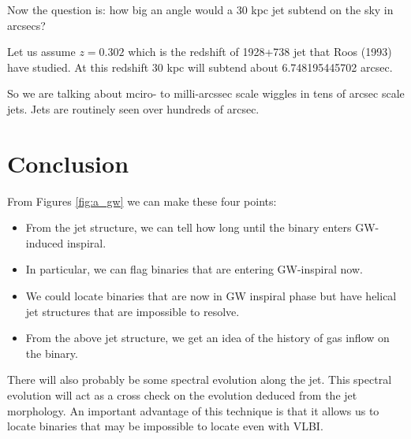\documentclass[iop]{emulateapj}
\begin{document}
Now the question is: how big an angle would a 30 kpc jet subtend on
the sky in arcsecs?

Let us assume $z = 0.302$ which is the redshift of 1928+738 jet that
Roos (1993) have studied.  At this redshift 30 kpc will subtend about
6.748195445702 arcsec.

So we are talking about mciro- to milli-arcssec scale wiggles in tens
of arcsec scale jets.  Jets are routinely seen over hundreds of
arcsec.



\section{Conclusion}

From Figures \ref{fig:a_gw} we can make these four points:

\begin{itemize}
\item From the jet structure, we can tell how long until the binary enters GW-induced inspiral.
\item In particular, we can flag binaries that are entering GW-inspiral now.
\item We could locate binaries that are now in GW inspiral phase but
  have helical jet structures that are impossible to resolve.
\item From the above jet structure, we get an idea of the history of gas inflow on the binary.
\end{itemize}

There will also probably be some spectral evolution along the jet.
This spectral evolution will act as a cross check on the evolution
deduced from the jet morphology.  An important advantage of this
technique is that it allows us to locate binaries that may be
impossible to locate even with VLBI.
\end{document}
